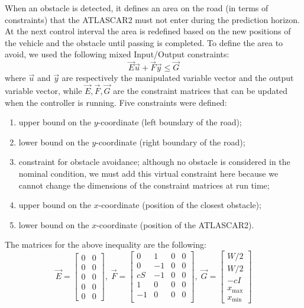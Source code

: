 When an obstacle is detected, it defines an area on the road (in terms of constraints) that the ATLASCAR2 must not enter during the prediction horizon. At the next control interval the area is redefined based on the new positions of the vehicle and the obstacle until passing is completed.
To define the area to avoid, we used the following mixed Input/Output constraints:
\begin{equation*}
\label{eqn:mixed_IO_constraints}
\vec{E}\vec{u}+\vec{F}\vec{y}\leq \vec{G}
\end{equation*}
where $\vec{u}$ and $\vec{y}$ are respectively the manipulated variable vector and the output variable vector, while $\vec{E},\vec{F},\vec{G}$ are the constraint matrices that can be updated when the controller is running. Five constraints were defined:
\begin{enumerate}
	\item upper bound on the $y$-coordinate (left boundary of the road);
	\item lower bound on the $y$-coordinate (right boundary of the road);
	\item constraint for obstacle avoidance; although no obstacle is considered in the nominal condition, we must add this virtual constraint here because we cannot change the dimensions of the constraint matrices at run time;
	\item upper bound on the $x$-coordinate (position of the closest obstacle);
	\item lower bound on the $x$-coordinate (position of the ATLASCAR2).
\end{enumerate}
The matrices for the above inequality are the following:
\[
\vec{E}= 
\begin{bmatrix}
0&0\\
0&0\\
0&0\\
0&0\\
0&0
\end{bmatrix},
\;
\vec{F}=\begin{bmatrix}
0&1&0&0\\
0&-1&0&0\\
cS&-1&0&0\\
1&0&0&0\\
-1&0&0&0\\
\end{bmatrix},\;
\vec{G}=
\begin{bmatrix}
W/2\\W/2\\-cI\\x_{\max}\\x_{\min}
\end{bmatrix}
\]
